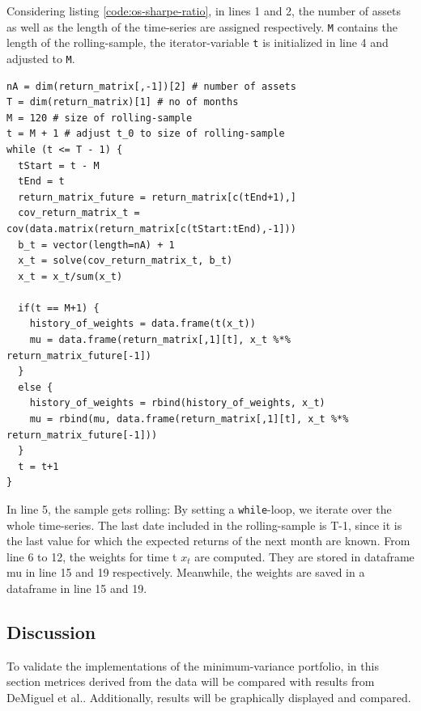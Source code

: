 Considering listing \ref{code:os-sharpe-ratio}, in lines 1 and 2, the number of assets as well as the length of the time-series are assigned respectively. \lstinline|M| contains the length of the rolling-sample, the iterator-variable \lstinline|t| is initialized in line 4 and adjusted to \lstinline|M|.\\

\begin{lstlisting}[caption={Computing the out-sample Sharpe ratio from the matrix of expected returns in R.}, label=code:os-sharpe-ratio, frame=single]
nA = dim(return_matrix[,-1])[2] # number of assets
T = dim(return_matrix)[1] # no of months
M = 120 # size of rolling-sample
t = M + 1 # adjust t_0 to size of rolling-sample
while (t <= T - 1) {
  tStart = t - M 
  tEnd = t 
  return_matrix_future = return_matrix[c(tEnd+1),] 
  cov_return_matrix_t = cov(data.matrix(return_matrix[c(tStart:tEnd),-1])) 
  b_t = vector(length=nA) + 1 
  x_t = solve(cov_return_matrix_t, b_t) 
  x_t = x_t/sum(x_t)
  
  if(t == M+1) { 
    history_of_weights = data.frame(t(x_t))
    mu = data.frame(return_matrix[,1][t], x_t %*% return_matrix_future[-1])
  }
  else {
    history_of_weights = rbind(history_of_weights, x_t)
    mu = rbind(mu, data.frame(return_matrix[,1][t], x_t %*% return_matrix_future[-1]))
  }
  t = t+1
}
\end{lstlisting}

In line 5, the sample gets rolling: By setting a \lstinline|while|-loop, we iterate over the whole time-series. The last date included in the rolling-sample is T-1, since it is the last value for which the expected returns of the next month are known. From line 6 to 12, the weights for time t $x_t$ are computed. They are stored in dataframe mu in line 15 and 19 respectively. Meanwhile, the weights are saved in a dataframe in line 15 and 19.

\subsection{Discussion}
To validate the implementations of the minimum-variance portfolio, in this section metrices derived from the data will be compared with results from DeMiguel et al.\cite{DEM09}. Additionally, results will be graphically displayed and compared.\\

